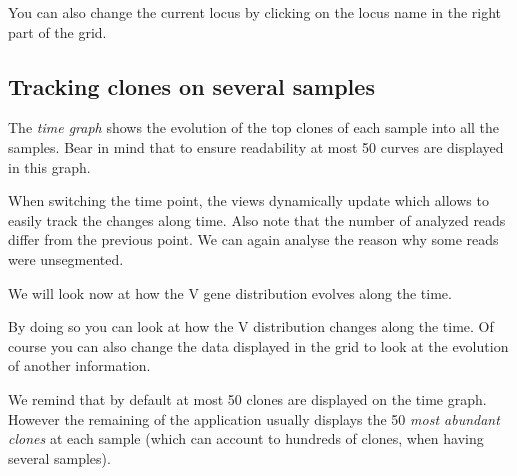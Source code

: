 \documentclass[11pt]{article}
\begin{document}



You can also change the current locus by clicking on the locus name in the
right part of the grid.


\subsection{Tracking clones on several samples}

The \textit{time graph} shows the evolution of the top clones of each sample into all the samples.
Bear in mind that to ensure readability at most 50 curves are displayed in this graph.



When switching the time point, the views dynamically update which allows to
easily track the changes along time. Also note that the number of analyzed
reads differ from the previous point. We can again analyse the reason why some
reads were unsegmented.

\bigskip

We will look now at how the V gene distribution evolves along the time.

By doing so you can look at how the V distribution changes along the time.
Of course you can also change the data displayed in the grid to look at
the evolution of another information.

\bigskip

We remind that by default at most 50 clones are displayed
on the time graph. However the remaining of the application usually displays
the 50 \textit{most abundant clones} at each sample (which can account to hundreds of
clones, when having several samples).
\end{document}
